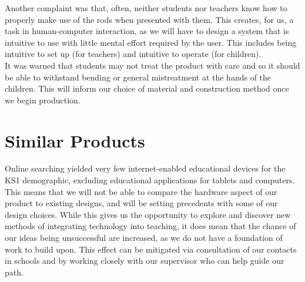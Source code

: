 Another complaint was that, often, neither students nor teachers know how to properly make use of the rods when presented with them. This creates, for us, a task in human-computer interaction, as we will have to design a system that is intuitive to use with little mental effort required by the user. This includes being intuitive to set up (for teachers) and intuitive to operate (for children).\\

It was warned that students may not treat the product with care and so it should be able to withstand bending or general mistreatment at the hands of the children. This will inform our choice of material and construction method once we begin production. \\


\section{Similar Products}
Online searching yielded very few internet-enabled educational devices for the KS1 demographic, excluding educational applications for tablets and computers. This means that we will not be able to compare the hardware aspect of our product to existing designs, and will be setting precedents with some of our design choices. While this gives us the opportunity to explore and discover new methods of integrating technology into teaching, it does mean that the chance of our ideas being unsuccessful are increased, as we do not have a foundation of work to build upon. This effect can be mitigated via consultation of our contacts in schools and by working closely with our supervisor who can help guide our path.




